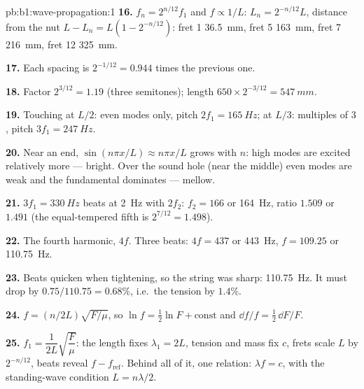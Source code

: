 \begin{solution}{pb:b1:wave-propagation:1}
\textbf{16.} $f_n = 2^{n/12}f_1$ and $f \propto 1/L$: $L_n = 2^{-n/12}L$,
distance from the nut $L - L_n = L(1 - 2^{-n/12})$: fret 1 \qty{36.5}{mm},
fret 5 \qty{163}{mm}, fret 7 \qty{216}{mm}, fret 12 \qty{325}{mm}.

\textbf{17.} Each spacing is $2^{-1/12} = 0.944$ times the previous one.

\textbf{18.} Factor $2^{3/12} = 1.19$ (three semitones); length
$650 \times 2^{-3/12} = \qty{547}{mm}$.

\textbf{19.} Touching at $L/2$: even modes only, pitch $2f_1 =
\qty{165}{Hz}$; at $L/3$: multiples of $3$, pitch $3f_1 = \qty{247}{Hz}$.

\textbf{20.} Near an end, $\sin(n\pi x/L) \approx n\pi x/L$ grows with
$n$: high modes are excited relatively more --- bright. Over the sound
hole (near the middle) even modes are weak and the fundamental dominates
--- mellow.

\textbf{21.} $3f_1 = \qty{330}{Hz}$ beats at \qty{2}{Hz} with $2f_2$:
$f_2 = 166$ or \qty{164}{Hz}, ratio $1.509$ or $1.491$ (the equal-tempered
fifth is $2^{7/12} = 1.498$).

\textbf{22.} The fourth harmonic, $4f$. Three beats: $4f = 437$ or
\qty{443}{Hz}, $f = 109.25$ or \qty{110.75}{Hz}.

\textbf{23.} Beats quicken when tightening, so the string was sharp:
\qty{110.75}{Hz}. It must drop by $0.75/110.75 = 0.68\%$, i.e.\ the
tension by $1.4\%$.

\textbf{24.} $f = (n/2L)\sqrt{F/\mu}$, so $\ln f = \tfrac12\ln F + \text{const}$
and $\dd f/f = \tfrac12\,\dd F/F$.

\textbf{25.} $f_1 = \dfrac{1}{2L}\sqrt{\dfrac{F}{\mu}}$: the length fixes
$\lambda_1 = 2L$, tension and mass fix $c$, frets scale $L$ by
$2^{-n/12}$, beats reveal $f - f_{\text{ref}}$. Behind all of it, one
relation: $\lambda f = c$, with the standing-wave condition $L = n\lambda/2$.
\end{solution}
